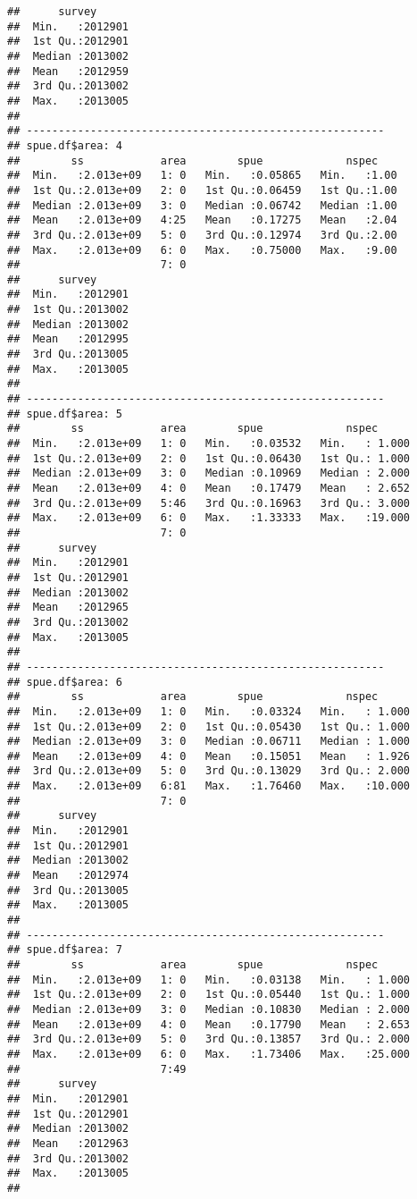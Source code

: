 \documentclass[]{article}
\begin{document}
\begin{verbatim}
##      survey       
##  Min.   :2012901  
##  1st Qu.:2012901  
##  Median :2013002  
##  Mean   :2012959  
##  3rd Qu.:2013002  
##  Max.   :2013005  
##                   
## -------------------------------------------------------- 
## spue.df$area: 4
##        ss            area        spue             nspec     
##  Min.   :2.013e+09   1: 0   Min.   :0.05865   Min.   :1.00  
##  1st Qu.:2.013e+09   2: 0   1st Qu.:0.06459   1st Qu.:1.00  
##  Median :2.013e+09   3: 0   Median :0.06742   Median :1.00  
##  Mean   :2.013e+09   4:25   Mean   :0.17275   Mean   :2.04  
##  3rd Qu.:2.013e+09   5: 0   3rd Qu.:0.12974   3rd Qu.:2.00  
##  Max.   :2.013e+09   6: 0   Max.   :0.75000   Max.   :9.00  
##                      7: 0                                   
##      survey       
##  Min.   :2012901  
##  1st Qu.:2013002  
##  Median :2013002  
##  Mean   :2012995  
##  3rd Qu.:2013005  
##  Max.   :2013005  
##                   
## -------------------------------------------------------- 
## spue.df$area: 5
##        ss            area        spue             nspec       
##  Min.   :2.013e+09   1: 0   Min.   :0.03532   Min.   : 1.000  
##  1st Qu.:2.013e+09   2: 0   1st Qu.:0.06430   1st Qu.: 1.000  
##  Median :2.013e+09   3: 0   Median :0.10969   Median : 2.000  
##  Mean   :2.013e+09   4: 0   Mean   :0.17479   Mean   : 2.652  
##  3rd Qu.:2.013e+09   5:46   3rd Qu.:0.16963   3rd Qu.: 3.000  
##  Max.   :2.013e+09   6: 0   Max.   :1.33333   Max.   :19.000  
##                      7: 0                                     
##      survey       
##  Min.   :2012901  
##  1st Qu.:2012901  
##  Median :2013002  
##  Mean   :2012965  
##  3rd Qu.:2013002  
##  Max.   :2013005  
##                   
## -------------------------------------------------------- 
## spue.df$area: 6
##        ss            area        spue             nspec       
##  Min.   :2.013e+09   1: 0   Min.   :0.03324   Min.   : 1.000  
##  1st Qu.:2.013e+09   2: 0   1st Qu.:0.05430   1st Qu.: 1.000  
##  Median :2.013e+09   3: 0   Median :0.06711   Median : 1.000  
##  Mean   :2.013e+09   4: 0   Mean   :0.15051   Mean   : 1.926  
##  3rd Qu.:2.013e+09   5: 0   3rd Qu.:0.13029   3rd Qu.: 2.000  
##  Max.   :2.013e+09   6:81   Max.   :1.76460   Max.   :10.000  
##                      7: 0                                     
##      survey       
##  Min.   :2012901  
##  1st Qu.:2012901  
##  Median :2013002  
##  Mean   :2012974  
##  3rd Qu.:2013005  
##  Max.   :2013005  
##                   
## -------------------------------------------------------- 
## spue.df$area: 7
##        ss            area        spue             nspec       
##  Min.   :2.013e+09   1: 0   Min.   :0.03138   Min.   : 1.000  
##  1st Qu.:2.013e+09   2: 0   1st Qu.:0.05440   1st Qu.: 1.000  
##  Median :2.013e+09   3: 0   Median :0.10830   Median : 2.000  
##  Mean   :2.013e+09   4: 0   Mean   :0.17790   Mean   : 2.653  
##  3rd Qu.:2.013e+09   5: 0   3rd Qu.:0.13857   3rd Qu.: 2.000  
##  Max.   :2.013e+09   6: 0   Max.   :1.73406   Max.   :25.000  
##                      7:49                                     
##      survey       
##  Min.   :2012901  
##  1st Qu.:2012901  
##  Median :2013002  
##  Mean   :2012963  
##  3rd Qu.:2013002  
##  Max.   :2013005  
## 
\end{verbatim}
\end{document}
